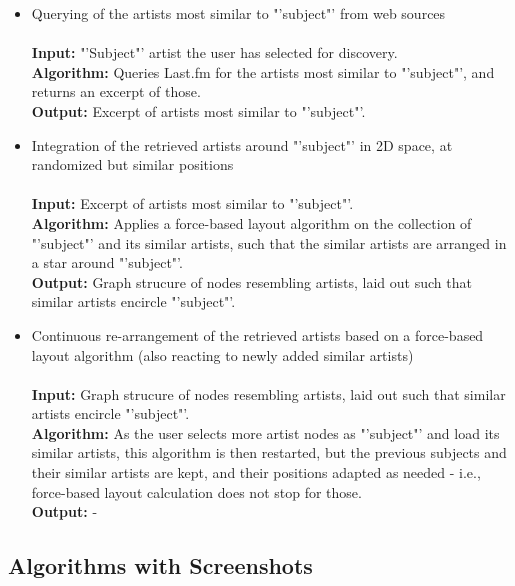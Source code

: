 \begin{itemize}
	\item Querying of the artists most similar to "'subject"' from web sources \\\\
				\textbf{Input:} "'Subject"' artist the user has selected for discovery. \\
				\textbf{Algorithm:} Queries Last.fm for the artists most similar to "'subject"', and returns
				an excerpt of those. \\
				\textbf{Output:} Excerpt of artists most similar to "'subject"'. \\
	\item Integration of the retrieved artists around "'subject"' in 2D space, at randomized but similar positions \\\\
				\textbf{Input:} Excerpt of artists most similar to "'subject"'. \\
				\textbf{Algorithm:} Applies a force-based layout algorithm on the collection of "'subject"' and
				its similar artists, such that the similar artists are arranged in a star around "'subject"'. \\
				\textbf{Output:} Graph strucure of nodes resembling artists, laid out such that similar
				artists encircle "'subject"'. \\
	\item Continuous re-arrangement of the retrieved artists based on a force-based layout algorithm (also reacting to newly added similar artists) \\\\
				\textbf{Input:} Graph strucure of nodes resembling artists, laid out such that similar
				artists encircle "'subject"'. \\
				\textbf{Algorithm:} As the user selects more artist nodes as "'subject"' and load
				its similar artists, this algorithm is then restarted, but the previous subjects and their
				similar artists are kept, and their positions adapted as needed - i.e., force-based layout
				calculation does not stop for those. \\
				\textbf{Output:} - \\
\end{itemize}

\subsection{Algorithms with Screenshots}

